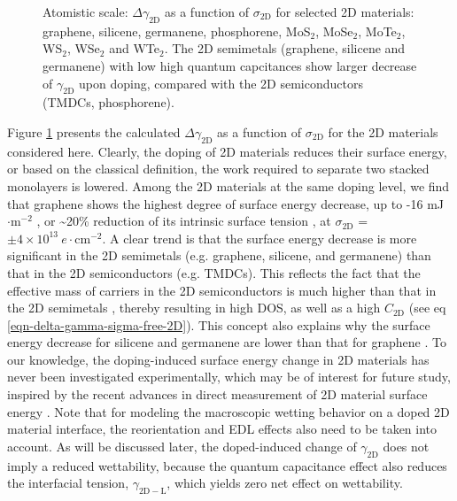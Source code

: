 \begin{figure}[htbp]
\centering
\caption{\label{fig:dgamma-sigma} Atomistic scale:
  \(\Delta \gamma_{\mathrm{2D}}\) as a function of
  \(\sigma_{\mathrm{2D}}\) for selected 2D materials: graphene,
  silicene, germanene, phosphorene, MoS\(_{2}\), MoSe\(_{2}\),
  MoTe\(_{2}\), WS\(_{2}\), WSe\(_{2}\) and WTe\(_{2}\). The 2D
  semimetals (graphene, silicene and germanene) with low high quantum
  capcitances show larger decrease of \(\gamma_{\mathrm{2D}}\) upon
  doping, compared with the 2D semiconductors (TMDCs, phosphorene).}
\end{figure}

Figure \ref{fig:dgamma-sigma} presents the calculated
\(\Delta \gamma_{\mathrm{2D}}\) as a function of
\(\sigma_{\mathrm{2D}}\) for the 2D materials considered
here. Clearly, the doping of 2D materials reduces their surface
energy, or based on the classical definition, the work required to
separate two stacked monolayers is lowered. Among the 2D materials at
the same doping level, we find that graphene shows the highest degree
of surface energy decrease, up to -16 mJ\(\cdot \mathrm{m}^{-2}\) , or
\textasciitilde{}20\% reduction of its intrinsic surface tension
\cite{shih_wetting_2013}, at \(\sigma_{\mathrm{2D}}\) =
\(\pm 4\times10^{13}\ e\cdot \mathrm{cm}^{-2}\).  A clear trend is
that the surface energy decrease is more significant in the 2D
semimetals (e.g. graphene, silicene, and germanene) than that in the
2D semiconductors (e.g. TMDCs). This reflects the fact that the
effective mass of carriers in the 2D semiconductors is much higher
than that in the 2D semimetals \cite{davies_two-dimensional_1997},
thereby resulting in high DOS, as well as a high \(C_{\mathrm{2D}}\)
(see eq \ref{eqn-delta-gamma-sigma-free-2D}). This concept also
explains why the surface energy decrease for silicene and germanene
are lower than that for graphene \cite{Yan_2013}.  To our knowledge,
the doping-induced surface energy change in 2D materials has never
been investigated experimentally, which may be of interest for future
study, inspired by the recent advances in direct measurement of 2D
material surface energy \cite{van_Engers_2017_direct_surf_gr}. Note
that for modeling the macroscopic wetting behavior on a doped 2D
material interface, the reorientation and EDL effects also need to be
taken into account.  As will be discussed later, the doped-induced
change of \(\gamma_{\mathrm{2D}}\) does not imply a reduced
wettability, because the quantum capacitance effect also reduces the
interfacial tension, \(\gamma_{\mathrm{2D-L}}\), which yields zero net
effect on wettability.


